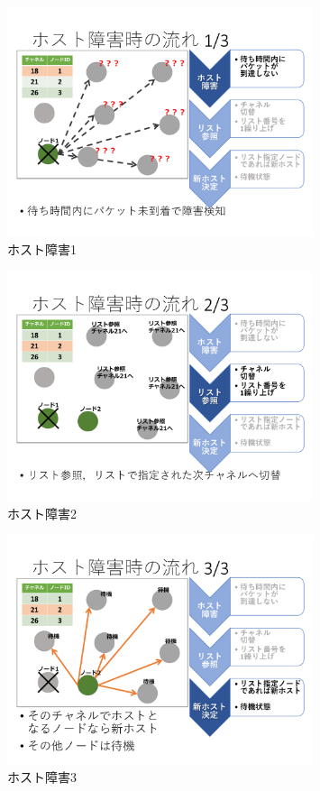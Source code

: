  \begin{figure}[H]
\centering
\includegraphics[width=0.8\textwidth]{figures/host1.pdf}
 \caption{ホスト障害1}
 \label{fig:host1}
\end{figure}

 \begin{figure}[H]
\centering
\includegraphics[width=0.8\textwidth]{figures/host2.pdf}
 \caption{ホスト障害2}
 \label{fig:host2}
\end{figure}

 \begin{figure}[H]
\centering
\includegraphics[width=0.8\textwidth]{figures/host3.pdf}
 \caption{ホスト障害3}
 \label{fig:host3}
\end{figure}


